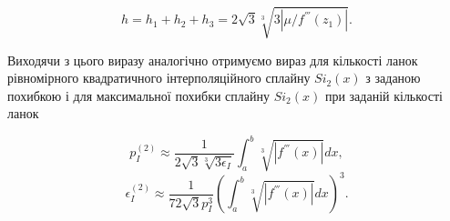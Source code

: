 \documentclass[ukrainian,14pt]{extarticle}
\begin{document}
$$h = h_1 + h_2 + h_3 = 2 \sqrt{3} \sqrt[3]{3|\mu/f^{'''}(z_1)|}.$$

Виходячи з цього виразу аналогічно отримуємо вираз для кількості ланок рівномірного квадратичного інтерполяційного сплайну $Si_2(x)$ з заданою похибкою і для максимальної похибки сплайну $Si_2(x)$ при заданій кількості ланок

$$p_I^{(2)} \approx \frac{1}{2\sqrt{3} \sqrt[3]{3\epsilon_I}} \int_a^b \sqrt[3]{|f^{'''}(x)|}dx,$$
$$\epsilon_I^{(2)} \approx \frac{1}{72 \sqrt{3} p_I^{3}} \left(\int_a^b \sqrt[3]{|f^{'''}(x)|}dx \right)^3.$$














\end{document}
